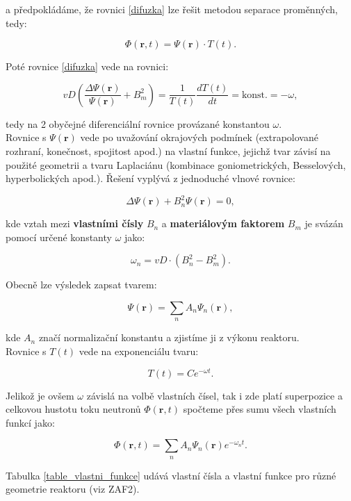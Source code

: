 a předpokládáme, že rovnici \eqref{difuzka} lze řešit metodou separace proměnných, tedy:

$$ \Phi (\textbf{r}, t) = \Psi (\textbf{r}) \cdot T(t). $$

Poté rovnice \eqref{difuzka} vede na rovnici:

\begin{equation}
  v D \left ( \dfrac{\Delta \Psi (\textbf{r})}{\Psi (\textbf{r})} + B_m^2 \right ) = \dfrac{1}{T(t)} \dfrac{d T(t)}{d t} = \text{konst.} = - \omega,
  \label{difuzka_v_separaci}
\end{equation}

tedy na 2 obyčejné diferenciální rovnice provázané konstantou $\omega$.\\

Rovnice s $\Psi (\textbf{r})$ vede po uvažování okrajových podmínek (extrapolované rozhraní, konečnost, spojitost apod.) na vlastní funkce, jejichž tvar závisí na použité geometrii a tvaru Laplaciánu (kombinace goniometrických, Besselových, hyperbolických apod.). Řešení vyplývá z jednoduché vlnové rovnice:

$$ \Delta \Psi (\textbf{r}) + B_n^2 \Psi (\textbf{r}) = 0, $$

kde vztah mezi \textbf{vlastními čísly} $B_n$ a \textbf{materiálovým faktorem} $B_m$ je svázán pomocí určené konstanty $\omega$ jako:

$$ \omega_n = vD \cdot (B_n^2-B_m^2). $$

Obecně lze výsledek zapsat tvarem:

$$ \Psi (\textbf{r}) = \sum_n A_n \Psi_n (\textbf{r}), $$

kde $A_n$ značí normalizační konstantu a zjistíme ji z výkonu reaktoru.\\

Rovnice s $T(t)$ vede na exponenciálu tvaru:

$$ T(t) = C e^{- \omega t}. $$

Jelikož je ovšem $\omega$ závislá na volbě vlastních čísel, tak i zde platí superpozice a celkovou hustotu toku neutronů $\Phi (\textbf{r}, t)$ spočteme přes sumu všech vlastních funkcí jako:

\begin{equation}
  \Phi (\textbf{r}, t) = \sum_n A_n \Psi_n (\textbf{r}) e^{- \omega_n t}.
  \label{difuzka_reseni}
\end{equation}

Tabulka \ref{table_vlastni_funkce} udává vlastní čísla a vlastní funkce pro různé geometrie reaktoru (viz ZAF2).

